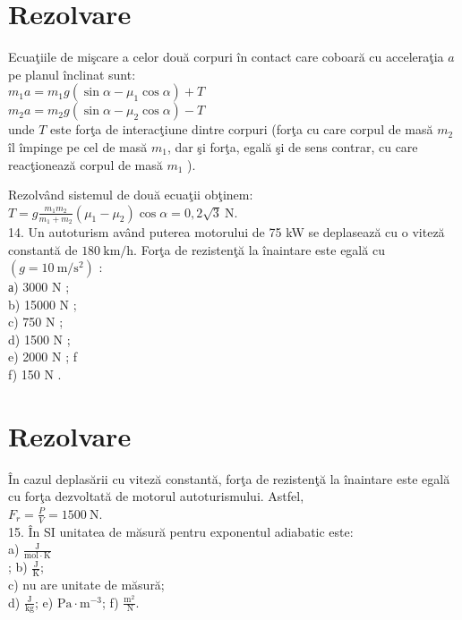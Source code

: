 \section*{Rezolvare}
Ecuaţiile de mişcare a celor două corpuri în contact care coboară cu acceleraţia $a$ pe planul înclinat sunt:\\
$m_{1} a=m_{1} g\left(\sin \alpha-\mu_{1} \cos \alpha\right)+T$\\
$m_{2} a=m_{2} g\left(\sin \alpha-\mu_{2} \cos \alpha\right)-T$\\
unde $T$ este forţa de interacţiune dintre corpuri (forţa cu care corpul de masă $m_{2}$ îl împinge pe cel de masă $m_{1}$, dar şi forţa, egală şi de sens contrar, cu care reacţionează corpul de masă $m_{1}$ ).

Rezolvând sistemul de două ecuaţii obţinem:\\
$T=g \frac{m_{1} m_{2}}{m_{1}+m_{2}}\left(\mu_{1}-\mu_{2}\right) \cos \alpha=0,2 \sqrt{3} \mathrm{~N}$.\\
14. Un autoturism având puterea motorului de 75 kW se deplasează cu o viteză constantă de $180 \mathrm{~km} / \mathrm{h}$. Forţa de rezistenţă la înaintare este egală cu $\left(g=10 \mathrm{~m} / \mathrm{s}^{2}\right)$ :\\
а) 3000 N ;\\
b) 15000 N ;\\
c) 750 N ;\\
d) 1500 N ;\\
e) 2000 N ; f\\
f) 150 N .

\section*{Rezolvare}
În cazul deplasării cu viteză constantă, forţa de rezistenţă la înaintare este egală cu forţa dezvoltată de motorul autoturismului. Astfel,\\
$F_{r}=\frac{P}{V}=1500 \mathrm{~N}$.\\
15. În SI unitatea de măsură pentru exponentul adiabatic este:\\
a) $\frac{\mathrm{J}}{\mathrm{mol} \cdot \mathrm{K}}$\\
; b) $\frac{\mathrm{J}}{\mathrm{K}}$;\\
c) nu are unitate de măsură;\\
d) $\frac{\mathrm{J}}{\mathrm{kg}}$; e) $\mathrm{Pa} \cdot \mathrm{m}^{-3}$; f) $\frac{\mathrm{m}^{2}}{\mathrm{~N}}$.

